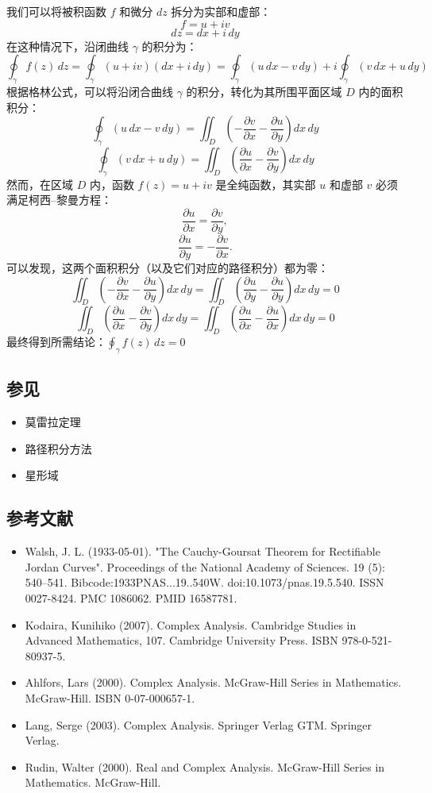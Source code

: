 我们可以将被积函数 $f$ 和微分 $dz$ 拆分为实部和虚部：
$$
f = u + iv~
$$
$$
dz = dx + i\,dy~
$$
在这种情况下，沿闭曲线 $\gamma$ 的积分为：
$$
\oint_{\gamma} f(z)\,dz
= \oint_{\gamma} (u + iv)(dx + i\,dy)
= \oint_{\gamma} (u\,dx - v\,dy)
+ i \oint_{\gamma} (v\,dx + u\,dy)~
$$
根据格林公式，可以将沿闭合曲线 $\gamma$ 的积分，转化为其所围平面区域 $D$ 内的面积积分：
$$
\oint_{\gamma} (u\,dx - v\,dy)
= \iint_{D} 
\left(
-\frac{\partial v}{\partial x} 
-\frac{\partial u}{\partial y}
\right)
dx\,dy~
$$
$$
\oint_{\gamma} (v\,dx + u\,dy)
= \iint_{D} 
\left(
\frac{\partial u}{\partial x} 
-\frac{\partial v}{\partial y}
\right)
dx\,dy~
$$
然而，在区域 $D$ 内，函数 $f(z) = u + iv$ 是全纯函数，其实部 $u$ 和虚部 $v$ 必须满足柯西–黎曼方程：
$$
\frac{\partial u}{\partial x} = \frac{\partial v}{\partial y},~
$$
$$
\frac{\partial u}{\partial y} = -\frac{\partial v}{\partial x}.~
$$
可以发现，这两个面积积分（以及它们对应的路径积分）都为零：
$$
\iint_{D}
\left(
-\frac{\partial v}{\partial x}
-\frac{\partial u}{\partial y}
\right)
dx\,dy
=
\iint_{D}
\left(
\frac{\partial u}{\partial y}
-\frac{\partial u}{\partial y}
\right)
dx\,dy
= 0~
$$
$$
\iint_{D}
\left(
\frac{\partial u}{\partial x}
-\frac{\partial v}{\partial y}
\right)
dx\,dy
=
\iint_{D}
\left(
\frac{\partial u}{\partial x}
-\frac{\partial u}{\partial x}
\right)
dx\,dy
= 0~
$$
最终得到所需结论：$\oint_{\gamma} f(z)\,dz = 0$
\subsection{参见}
\begin{itemize}
\item 莫雷拉定理
\item 路径积分方法
\item 星形域
\end{itemize}
\subsection{参考文献}
\begin{itemize}
\item Walsh, J. L. (1933-05-01). "The Cauchy-Goursat Theorem for Rectifiable Jordan Curves". Proceedings of the National Academy of Sciences. 19 (5): 540–541. Bibcode:1933PNAS...19..540W. doi:10.1073/pnas.19.5.540. ISSN 0027-8424. PMC 1086062. PMID 16587781.
\item Kodaira, Kunihiko (2007). Complex Analysis. Cambridge Studies in Advanced Mathematics, 107. Cambridge University Press. ISBN 978-0-521-80937-5.
\item Ahlfors, Lars (2000). Complex Analysis. McGraw-Hill Series in Mathematics. McGraw-Hill. ISBN 0-07-000657-1.
\item Lang, Serge (2003). Complex Analysis. Springer Verlag GTM. Springer Verlag.
\item Rudin, Walter (2000). Real and Complex Analysis. McGraw-Hill Series in Mathematics. McGraw-Hill.
\end{itemize}
